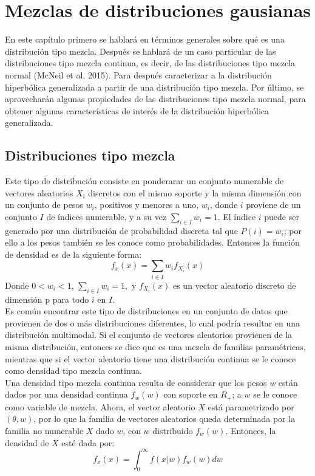 \chapter{Mezclas de distribuciones gausianas}

En este cap\'itulo primero se hablar\'a en t\'erminos generales sobre qu\'e es una distribuci\'on tipo mezcla. Despu\'es se hablar\'a de un caso particular de las distribuciones tipo mezcla continua, es decir, de las distribuciones tipo mezcla normal (McNeil et al, 2015). Para despu\'es caracterizar a la distribuci\'on hiperb\'olica generalizada a partir de una distribuci\'on tipo mezcla. Por \'ultimo, se aprovechar\'an algunas propiedades de las distribuciones tipo mezcla normal, para obtener algunas caracter\'isticas de inter\'es de la distribuci\'on hiperb\'olica generalizada.

\section{Distribuciones tipo mezcla }
Este tipo de distribución consiste en ponderarar un conjunto numerable de vectores aleatorios $X_{i}$  discretos con el mismo soporte y la misma dimensión con un conjunto de pesos $w_{i}$, positivos y menores a uno, $w_{i}$, donde $i$ proviene de un conjunto $I$ de índices numerable, y a su vez $\sum_{i\in I}w_{i}=1$. El índice $i$ puede ser generado por una distribución de probabilidad discreta tal que $P(i)=w_{i}$; por ello a los pesos también se les conoce como probabilidades. Entonces la función de densidad es de la siguiente forma:\\

\begin{equation*}
f_{x}(x)= \sum_{i\in I}w_{i}f_{X_{i}}(x)
\end{equation*}
Donde  $0<w_{i}<1$, $\sum_{i\in I}w_{i}=1,$ y $  f_{X_{i}}(x)$ es un vector aleatorio discreto de dimensión p para todo $i$ en $I$.\\

Es común encontrar este tipo de distribuciones en un conjunto de datos que provienen de dos o más distribuciones diferentes, lo cual podría resultar en una distribución multimodal. Si el conjunto de vectores aleatorios provienen de la misma distribución, entonces se dice que es una mezcla de familias paramétricas, mientras que si el vector aleatorio tiene una distribución continua se le conoce como densidad tipo mezcla continua.\\
Una densidad tipo mezcla continua resulta de considerar que los pesos $w$ están dados por una densidad continua $f_{w}(w)$ con soporte en $R_{+}$; a $w$ se le conoce como variable de mezcla. Ahora, el vector aleatorio $X$ está parametrizado por $(\theta,w)$, por lo que la familia de vectores aleatorios queda determinada por la familia no numerable  $ X$ dado $w$, con $w$ distribuido $f_{w}(w) $. Entonces, la densidad de $X$ esté dada por:\\
\begin{equation*}
f_{x}(x)=\int_{0}^{\infty}f(x|w)f_{w}(w)dw 
\end{equation*}



